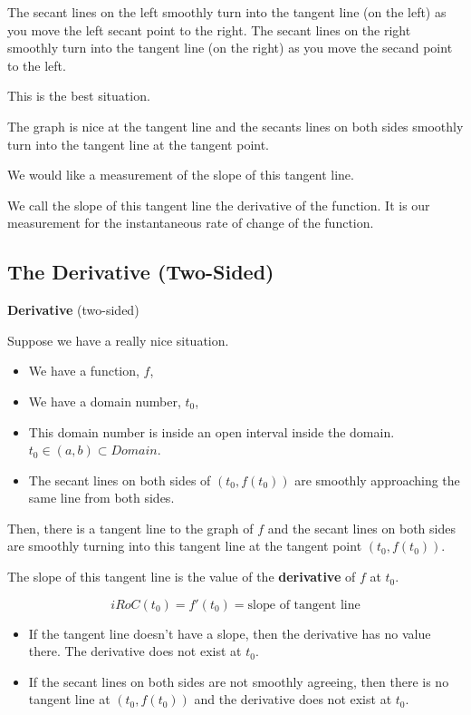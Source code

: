 \documentclass{ximera}
\begin{document}
The secant lines on the left smoothly turn into the tangent line (on the left) as you move the left secant point to the right. The secant lines on the right smoothly turn into the tangent line (on the right) as you move the secand point to the left. 



This is the best situation. 

The graph is nice at the tangent line and the secants lines on both sides smoothly turn into the tangent line at the tangent point. 


We would like a measurement of the slope of this tangent line.

We call the slope of this tangent line the derivative of the function. It is our measurement for the instantaneous rate of change of the function.













\subsection*{The Derivative (Two-Sided)}





\begin{definition} \textbf{\textcolor{green!50!black}{Derivative}}  (two-sided)


Suppose we have a really nice situation.


\begin{itemize}
\item We have a function, $f$, 
\item We have a domain number, $t_0$, 
\item This domain number is inside an open interval inside the domain.  $t_0 \in (a, b) \subset Domain$. 
\item The secant lines on both sides of $(t_0, f(t_0))$ are smoothly approaching the same line from both sides.
\end{itemize}

Then, there is a tangent line to the graph of $f$ and the secant lines on both sides are smoothly turning into this tangent line at the tangent point $(t_0, f(t_0))$. 

The slope of this tangent line is the value of the \textbf{derivative} of $f$ at $t_0$.

\[
iRoC(t_0) =f'(t_0) = \text{slope of tangent line}
\]


\begin{itemize}
  \item If the tangent line doesn't have a slope, then the derivative has no value there. The derivative does not exist at $t_0$.

  \item If the secant lines on both sides are not smoothly agreeing, then there is no tangent line at $(t_0, f(t_0))$ and the derivative does not exist at $t_0$.   
\end{itemize}

\end{definition}
\end{document}
